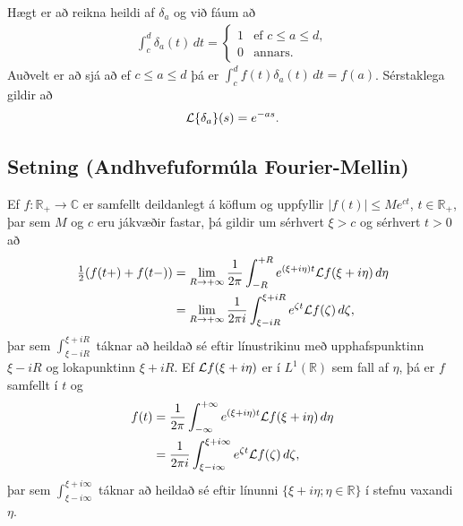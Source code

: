 \documentclass[a4paper,10pt,icelandic]{sphinxmanual}
\begin{document}
Hægt er að reikna heildi af \(\delta_a\) og við fáum að
\begin{equation*}
\begin{split}\int_c^d \delta_a(t)\,dt=\left\{\begin{array}{ll}
1 & \mbox{ef }c\leq a\leq d,\\
0 & \mbox{annars.}
\end{array}\right.\end{split}
\end{equation*}
Auðvelt er að sjá að ef \(c\leq a\leq d\) þá er \(\int_c^d f(t)\delta_a(t)\,dt=f(a)\). Sérstaklega gildir að
\begin{equation*}
\begin{split}{\cal L}\{\delta_a\}(s)=e^{-as}.\end{split}
\end{equation*}

\subsection{Setning (Andhvefuformúla Fourier-Mellin)}
\label{\detokenize{Kafli10:setning-andhvefuformula-fourier-mellin}}
Ef \(f:\mathbb{R}_+\to {\mathbb{C}}\) er samfellt deildanlegt á köflum og uppfyllir \(|f(t)|\leq Me^{ct}\), \(t\in \mathbb{R}_+\), þar sem \(M\) og \(c\) eru jákvæðir fastar, þá gildir um sérhvert \(\xi>c\) og sérhvert \(t>0\) að
\begin{equation*}
\begin{split}\begin{aligned}
\tfrac 12(f(t+)+f(t-)) &= \lim_{R\to +\infty} \dfrac 1{2\pi}
\int_{-R}^{+R}e^{(\xi+i\eta)t}{\cal L} f(\xi+i\eta) \, d\eta\\
&= \lim_{R\to +\infty} \dfrac 1{2\pi i}
\int_{\xi-iR}^{\xi+iR}e^{\zeta t}{\cal L} f(\zeta) \, d\zeta,\nonumber\end{aligned}\end{split}
\end{equation*}
þar sem \(\int_{\xi-iR}^{\xi+iR}\) táknar að heildað sé eftir línustrikinu með upphafspunktinn \(\xi-iR\) og lokapunktinn \(\xi+iR\). Ef \({\cal L} f(\xi+i\eta)\) er í \(L^ 1(\mathbb{R})\) sem fall af \(\eta\), þá er \(f\) samfellt í \(t\) og
\begin{equation*}
\begin{split}\begin{aligned}
f(t)&=  \dfrac 1{2\pi}
\int_{-\infty}^{+\infty}e^{(\xi+i\eta)t}{\cal L} f(\xi+i\eta) \, d\eta\\
&= \dfrac 1{2\pi i}
\int_{\xi-i\infty}^{\xi+i\infty}e^{\zeta t}{\cal L} f(\zeta) \,
d\zeta,\nonumber\end{aligned}\end{split}
\end{equation*}
þar sem \(\int_{\xi-i\infty}^{\xi+i\infty}\) táknar að heildað sé eftir línunni \(\{\xi+i\eta; \eta\in \mathbb{R}\}\) í stefnu vaxandi \(\eta\).
\end{document}
